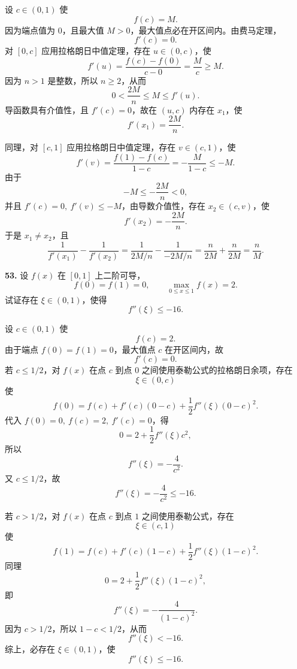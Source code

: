 \begin{solutionblock}
设 \(c\in(0,1)\) 使
\[
f(c)=M.
\]
因为端点值为 \(0\)，且最大值 \(M>0\)，最大值点必在开区间内。由费马定理，
\[
f'(c)=0.
\]
对 \([0,c]\) 应用拉格朗日中值定理，存在 \(u\in(0,c)\)，使
\[
f'(u)=\frac{f(c)-f(0)}{c-0}=\frac{M}{c}\ge M.
\]
因为 \(n>1\) 是整数，所以 \(n\ge2\)，从而
\[
0<\frac{2M}{n}\le M\le f'(u).
\]
导函数具有介值性，且 \(f'(c)=0\)，故在 \((u,c)\) 内存在 \(x_1\)，使
\[
f'(x_1)=\frac{2M}{n}.
\]

同理，对 \([c,1]\) 应用拉格朗日中值定理，存在 \(v\in(c,1)\)，使
\[
f'(v)=\frac{f(1)-f(c)}{1-c}=-\frac{M}{1-c}\le -M.
\]
由于
\[
-M\le-\frac{2M}{n}<0,
\]
并且 \(f'(c)=0,\ f'(v)\le -M\)，由导数介值性，存在 \(x_2\in(c,v)\)，使
\[
f'(x_2)=-\frac{2M}{n}.
\]
于是 \(x_1\ne x_2\)，且
\[
\frac{1}{f'(x_1)}-\frac{1}{f'(x_2)}
=\frac{1}{2M/n}-\frac{1}{-2M/n}
=\frac{n}{2M}+\frac{n}{2M}
=\frac{n}{M}.
\]
\end{solutionblock}

\begin{problemblock}
\textbf{53.} 设 \(f(x)\) 在 \([0,1]\) 上二阶可导，
\[
f(0)=f(1)=0,\qquad \max_{0\le x\le1}f(x)=2.
\]
试证存在 \(\xi\in(0,1)\)，使得
\[
f''(\xi)\le -16.
\]
\end{problemblock}

\begin{solutionblock}
设 \(c\in(0,1)\) 使
\[
f(c)=2.
\]
由于端点 \(f(0)=f(1)=0\)，最大值点 \(c\) 在开区间内，故
\[
f'(c)=0.
\]
若 \(c\le 1/2\)，对 \(f(x)\) 在点 \(c\) 到点 \(0\) 之间使用泰勒公式的拉格朗日余项，存在
\[
\xi\in(0,c)
\]
使
\[
f(0)=f(c)+f'(c)(0-c)+\frac12 f''(\xi)(0-c)^2.
\]
代入 \(f(0)=0,\ f(c)=2,\ f'(c)=0\)，得
\[
0=2+\frac12 f''(\xi)c^2,
\]
所以
\[
f''(\xi)=-\frac{4}{c^2}.
\]
又 \(c\le1/2\)，故
\[
f''(\xi)=-\frac{4}{c^2}\le -16.
\]

若 \(c>1/2\)，对 \(f(x)\) 在点 \(c\) 到点 \(1\) 之间使用泰勒公式，存在
\[
\xi\in(c,1)
\]
使
\[
f(1)=f(c)+f'(c)(1-c)+\frac12 f''(\xi)(1-c)^2.
\]
同理
\[
0=2+\frac12 f''(\xi)(1-c)^2,
\]
即
\[
f''(\xi)=-\frac{4}{(1-c)^2}.
\]
因为 \(c>1/2\)，所以 \(1-c<1/2\)，从而
\[
f''(\xi)<-16.
\]
综上，必存在 \(\xi\in(0,1)\)，使
\[
f''(\xi)\le -16.
\]
\end{solutionblock}

